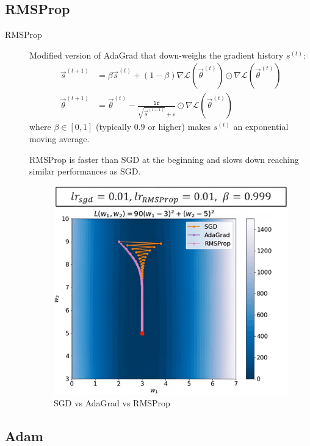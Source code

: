 \subsection{RMSProp}

\begin{description}
    \item[RMSProp] 
        Modified version of AdaGrad that down-weighs the gradient history $s^{(t)}$:
        \[
            \begin{split}
                \vec{s}^{(t+1)} &= \beta \vec{s}^{(t)} + (1-\beta) \nabla\mathcal{L}(\vec{\theta}^{(t)}) \odot \nabla\mathcal{L}(\vec{\theta}^{(t)}) \\
                \vec{\theta}^{(t+1)} &= \vec{\theta}^{(t)} - \frac{\texttt{lr}}{\sqrt{\vec{s}^{(t+1)}} + \varepsilon} \odot \nabla\mathcal{L}(\vec{\theta}^{(t)})
            \end{split}
        \]
        where $\beta \in [0, 1]$ (typically $0.9$ or higher) makes $s^{(t)}$ an exponential moving average.

        \begin{remark}
            RMSProp is faster than SGD at the beginning and slows down reaching similar performances as SGD.
        \end{remark}

        \begin{figure}[H]
            \centering
            \includegraphics[width=0.35\linewidth]{./img/rmsprop.png}
            \caption{SGD vs AdaGrad vs RMSProp}
        \end{figure}
\end{description}


\subsection{Adam}

